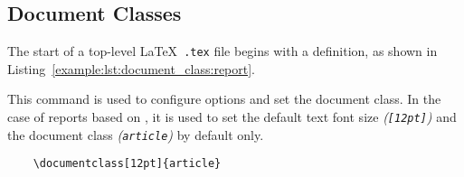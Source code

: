 \subsection{Document Classes}
The start of a top-level \LaTeX\ \texttt{.tex} file begins with a  definition, as shown in Listing~\ref{example:lst:document_class:report}.

This command is used to configure options and set the document class. In the case of reports based on \uswdwmspkg{}, it is used to set the default text font size \textit{(\texttt{[12pt]})} and the document class \textit{(\texttt{article})} by default only.


\begin{listing}[H]
  \captionsetup{skip=\skiplistingcaptionlen}
  \begin{verbatim}
    \documentclass[12pt]{article}
  \end{verbatim}
  \caption{\LaTeX\ \texttt{\textbackslash documentclass} command example}
  \label{example:lst:document_class:report}
\end{listing}
